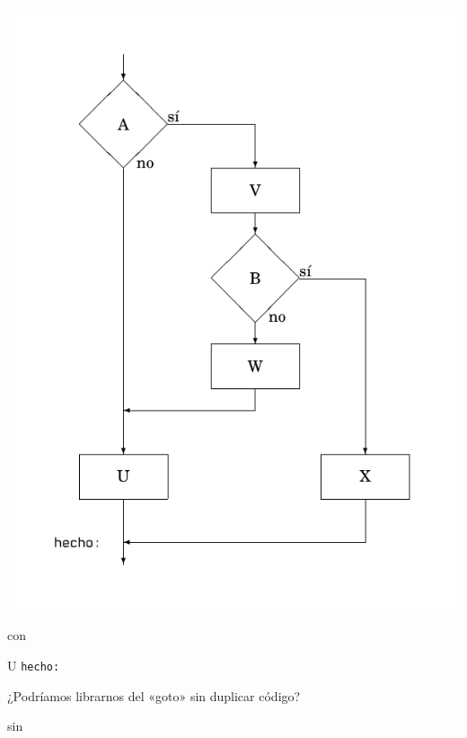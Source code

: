 \documentclass{tfg_domingo}
\begin{document}
\begin{minipage}{.6\linewidth}
\begin{center}
\includegraphics[scale=.8]{diagrama}
\end{center}
\end{minipage}
\hfill
\begin{minipage}{.3\linewidth}
\begin{center}
\NoCaptionOfAlgo
\begin{algorithm}[H]
\caption{con}
\DontPrintSemicolon
{}
U\;
\texttt{hecho:}
\end{algorithm}
\end{center}
\end{minipage}

¿Podríamos librarnos del «goto» sin duplicar código?

\NoCaptionOfAlgo
\begin{algorithm}[H]
\caption{sin}
\DontPrintSemicolon
{}
\end{algorithm}
\vspace{5mm}
\end{document}

